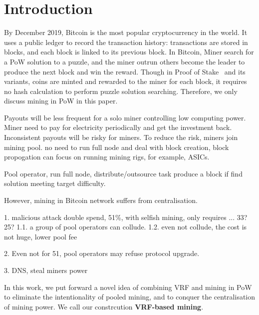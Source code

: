 \section{Introduction}

By December 2019, Bitcoin is the most popular cryptocurrency in the world.
It uses a public ledger to record the transaction history: transactions are stored in blocks, and each block is linked to its previous block.
In Bitcoin, Miner search for a PoW solution to a puzzle, and the miner outrun others become the leader to produce the next block and win the reward.
Though in Proof of Stake~\cite{} and its variants, coins are minted and rewarded to the miner for each block, it requires no hash calculation to perform puzzle solution searching.
Therefore, we only discuss mining in PoW in this paper.


Payouts will be less frequent for a solo miner controlling low computing power. Miner need to pay for electricity periodically and get the investment back.
Inconsistent payouts will be risky for miners.
To reduce the risk, miners join mining pool.
no need to run full node and deal with block creation, block propogation
can focus on running mining rigs, for example, ASICs.

Pool operator, run full node, distribute/outsource task
produce a block if find solution meeting target difficulty.

However, mining in Bitcoin network suffers from centralisation.




1. malicious attack
double spend, 51\%, with selfish mining, only requires ... 33?25?
1.1. a group of pool operators can collude.
1.2. even not collude, the cost is not huge, lower pool fee

2. Even not for 51, 
pool operators may refuse protocol upgrade. 


3. DNS, steal miners power


In this work, we put forward a novel idea of combining VRF and mining in PoW to eliminate the intentionality of pooled mining, and to conquer the centralisation of mining power. We call our constrcution \textbf{VRF-based mining}.